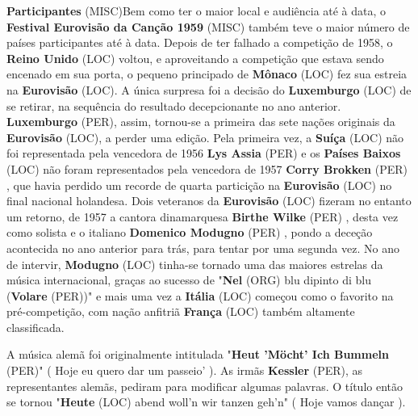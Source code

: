 \documentclass[12pt,a4paper]{article}
\begin{document}
\textbf{Participantes} (MISC)Bem como ter o maior local e audiência até à data, o \textbf{Festival Eurovisão da Canção 1959} (MISC) também teve o maior número de países participantes até à data. Depois de ter falhado a competição de 1958, o \textbf{Reino Unido} (LOC) voltou, e aproveitando a competição que estava sendo encenado em sua porta, o pequeno principado de \textbf{Mônaco} (LOC) fez sua estreia na \textbf{Eurovisão} (LOC). A única surpresa foi a decisão do \textbf{Luxemburgo} (LOC) de se retirar, na sequência do resultado decepcionante no ano anterior. \textbf{Luxemburgo} (PER), assim, tornou-se a primeira das sete nações originais da \textbf{Eurovisão} (LOC), a perder uma edição. Pela primeira vez, a \textbf{Suíça} (LOC) não foi representada pela vencedora de 1956 \textbf{Lys Assia} (PER) e os \textbf{Países Baixos} (LOC) não foram representados pela vencedora de 1957 \textbf{Corry Brokken} (PER) , que havia perdido um recorde de quarta particição na \textbf{Eurovisão} (LOC) no final nacional holandesa. Dois veteranos da \textbf{Eurovisão} (LOC) fizeram no entanto um retorno, de 1957 a cantora dinamarquesa \textbf{Birthe Wilke} (PER) , desta vez como solista e o italiano \textbf{Domenico Modugno} (PER) , pondo a deceção acontecida no ano anterior para trás, para tentar por uma segunda vez. No ano de intervir, \textbf{Modugno} (LOC) tinha-se tornado uma das maiores estrelas da música internacional, graças ao sucesso de "\textbf{Nel} (ORG) blu dipinto di blu (\textbf{Volare} (PER))" e mais uma vez a \textbf{Itália} (LOC) começou como o favorito na pré-competição, com nação anfitriã \textbf{França} (LOC) também altamente classificada.

A música alemã foi originalmente intitulada "\textbf{Heut 'Möcht' Ich Bummeln} (PER)" ( Hoje eu quero dar um passeio' ). As irmãs \textbf{Kessler} (PER), as representantes alemãs, pediram para modificar algumas palavras. O título então se tornou "\textbf{Heute} (LOC) abend woll'n wir tanzen geh'n" ( Hoje vamos dançar ).
\end{document}
